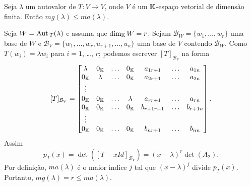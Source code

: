 \begin{proposicao}
    Seja $\lambda$ um autovalor de $T : V \to V$, onde $V$ \'e um $\mathbb{K}$-espa\c{c}o vetorial de dimens\~ao finita. Ent\~ao $mg(\lambda) \le ma(\lambda)$.
\end{proposicao}
\begin{prova}
    Seja $W = {\rm Aut\,}_T(\lambda)$ e assuma que $\dim_{\mathbb{K}}W = r$. Sejam $\mathcal{B}_W = \{w_1,\dots,w_r\}$ uma base de $W$ e $\mathcal{B}_V = \{w_1,\dots,w_r,u_{r + 1},\dots,u_n\}$ uma base de $V$ contendo $\mathcal{B}_W$. Como $T(w_i) = \lambda w_i$ para $i = 1$, \dots, $r$; podemos escrever $[T]_{\mathcal{B}_V}$ na forma
    \[
        [T]_{\mathcal{B}_V} = \begin{bmatrix}
            \lambda & 0_{\mathbb{K}} & \dots & 0_{\mathbb{K}} & a_{1r+1} & \dots & a_{1n}\\
            0_{\mathbb{K}} & \lambda &  \dots & 0_{\mathbb{K}} & a_{2r+1} & \dots & a_{2n}\\
            \vdots\\
            0_{\mathbb{K}} & 0_{\mathbb{K}} & \dots & \lambda & a_{rr+1} & \dots & a_{rn}\\
            0_{\mathbb{K}} & 0_{\mathbb{K}} & \dots & 0_{\mathbb{K}} & b_{r+1r+1} & \dots & b_{r+1n}\\
            \vdots\\
            0_{\mathbb{K}} & 0_{\mathbb{K}} & \dots & 0_{\mathbb{K}} & b_{nr+1} & \dots & b_{nn}\\
        \end{bmatrix}.
    \]
    Assim
    \[
        p_T(x) = \det([T - xId]_{\mathcal{B}_V}) = (x - \lambda)^r\det(A_2).
    \]
    Por defini\c{c}\~ao, $ma(\lambda)$ \'e o maior {\'\i}ndice $j$ tal que $(x - \lambda)^j$ divide $p_T(x)$. Portanto, $mg(\lambda) = r \le ma(\lambda)$.
\end{prova}

